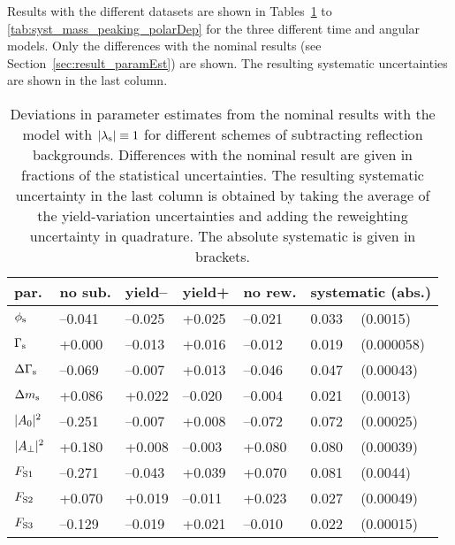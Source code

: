 Results with the different datasets are shown in Tables~\ref{tab:syst_mass_peaking_phi} to \ref{tab:syst_mass_peaking_polarDep} for the
three different time and angular models. Only the differences with the nominal results (see Section~\ref{sec:result_paramEst}) are shown.
The resulting systematic uncertainties are shown in the last column.

\begin{table}[htbp]
  \centering
  \caption{Deviations in parameter estimates from the nominal results with the model with $\lamsAbs\equiv1$ for different schemes of
           subtracting reflection backgrounds.
           Differences with the nominal result are given in fractions of the statistical uncertainties. The resulting systematic
           uncertainty in the last column is obtained by taking the average of the yield-variation uncertainties and adding the reweighting
           uncertainty in quadrature. The absolute systematic is given in brackets.}
  \label{tab:syst_mass_peaking_phi}
  \begin{tabular}{lllllll}
    \hline
    par.            &  no sub.    &  yield--  &  yield+   &  no rew.  &  \multicolumn{2}{l}{systematic (abs.)}  \\
    \hline
    $\phis$         &  --0.041    &  --0.025  &   +0.025  &  --0.021  &  0.033  &  (0.0015)                     \\
    \hline
    $\Gs$           &   +0.000    &  --0.013  &   +0.016  &  --0.012  &  0.019  &  (0.000058)                   \\
    $\DGs$          &  --0.069    &  --0.007  &   +0.013  &  --0.046  &  0.047  &  (0.00043)                    \\
    $\Dms$          &   +0.086    &   +0.022  &  --0.020  &  --0.004  &  0.021  &  (0.0013)                     \\
    \hline
    $\magzeroSq$    &  --0.251    &  --0.007  &   +0.008  &  --0.072  &  0.072  &  (0.00025)                    \\
    $\magperpSq$    &   +0.180    &   +0.008  &  --0.003  &   +0.080  &  0.080  &  (0.00039)                    \\
    $\FS[1]$        &  --0.271    &  --0.043  &   +0.039  &   +0.070  &  0.081  &  (0.0044)                     \\
    $\FS[2]$        &   +0.070    &   +0.019  &  --0.011  &   +0.023  &  0.027  &  (0.00049)                    \\
    $\FS[3]$        &  --0.129    &  --0.019  &   +0.021  &  --0.010  &  0.022  &  (0.00015)                    \\

\end{tabular}
\end{table}

